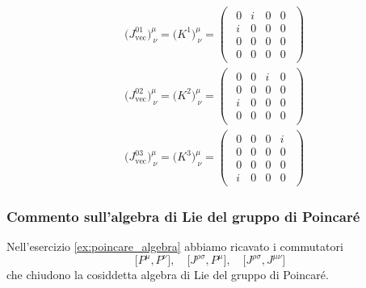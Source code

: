 \documentclass[../main.tex]{subfiles}
\begin{document}
\begin{exercise}
\begin{itemize}
        \[\boxed{
        \begin{aligned}
            &\big(J^{01}_\text{vec}\big)^\mu_{~\nu} = \big(K^1\big)^\mu_{~\nu}
            =
            \begin{pmatrix}
            \begin{array}{c|ccc}
                 0   &   i   &   0   &   0\\
                \hline
                i   &   0   &   0   &   0\\
                0   &   0   &   0   &   0\\
                0   &   0   &   0   &   0
            \end{array}
            \end{pmatrix} \\
            &\big(J^{02}_\text{vec}\big)^\mu_{~\nu} = \big(K^2\big)^\mu_{~\nu} = \begin{pmatrix}
            \begin{array}{c|ccc}
                 0   &   0   &   i   &   0\\
                \hline
                0   &   0   &   0   &   0\\
                i   &   0   &   0   &   0\\
                0   &   0   &   0   &   0
            \end{array}
            \end{pmatrix}\\
            &\big(J^{03}_\text{vec}\big)^\mu_{~\nu} = \big(K^3\big)^\mu_{~\nu}= \begin{pmatrix}
            \begin{array}{c|ccc}
                 0   &   0   &   0   &   i\\
                \hline
                0   &   0   &   0   &   0\\
                0   &   0   &   0   &   0\\
                i   &   0   &   0   &   0
            \end{array}
            \end{pmatrix}
        \end{aligned}}\]
    \end{itemize}
    
\end{exercise}
\subsubsection{Commento sull'algebra di Lie del gruppo di Poincaré}
Nell'esercizio \ref{ex:poincare_algebra} abbiamo ricavato i commutatori 
\[
\big[P^\mu, P^\nu\big] , \quad \big[ J^{\rho\sigma}, P^\mu \big] , \quad \big[ J^{\rho\sigma}, J^{\mu\nu} \big]
\]
che chiudono la cosiddetta algebra di Lie del gruppo di Poincaré. 
\end{document}
